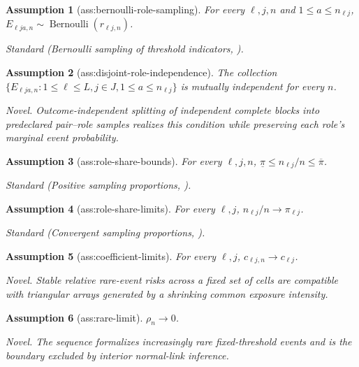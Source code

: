 \documentclass{article}
\newtheorem{assumption}{Assumption}
\begin{document}
\begin{assumption}[ass:bernoulli-role-sampling]\label{ass:bernoulli-role-sampling}
For every \(\ell,j,n\) and \(1\le a\le n_{\ell j}\), \(E_{\ell j a,n}\sim\operatorname{Bernoulli}(r_{\ell j,n})\).
\par\smallskip\noindent\emph{Standard} (Bernoulli sampling of threshold indicators, \cite{BrownCaiDasGupta2001}).
\end{assumption}

\begin{assumption}[ass:disjoint-role-independence]\label{ass:disjoint-role-independence}
The collection \(\{E_{\ell j a,n}:1\le\ell\le L, j\in J,1\le a\le n_{\ell j}\}\) is mutually independent for every \(n\).
\par\smallskip\noindent\emph{Novel.} Outcome-independent splitting of independent complete blocks into predeclared pair--role samples realizes this condition while preserving each role's marginal event probability.
\end{assumption}

\begin{assumption}[ass:role-share-bounds]\label{ass:role-share-bounds}
For every \(\ell,j,n\), \(\underline\pi\le n_{\ell j}/n\le\overline\pi\).
\par\smallskip\noindent\emph{Standard} (Positive sampling proportions, \cite{DjuazonTsyawo2026}).
\end{assumption}

\begin{assumption}[ass:role-share-limits]\label{ass:role-share-limits}
For every \(\ell,j\), \(n_{\ell j}/n\to\pi_{\ell j}\).
\par\smallskip\noindent\emph{Standard} (Convergent sampling proportions, \cite{DjuazonTsyawo2026}).
\end{assumption}

\begin{assumption}[ass:coefficient-limits]\label{ass:coefficient-limits}
For every \(\ell,j\), \(c_{\ell j,n}\to c_{\ell j}\).
\par\smallskip\noindent\emph{Novel.} Stable relative rare-event risks across a fixed set of cells are compatible with triangular arrays generated by a shrinking common exposure intensity.
\end{assumption}

\begin{assumption}[ass:rare-limit]\label{ass:rare-limit}
\(\rho_n\to0\).
\par\smallskip\noindent\emph{Novel.} The sequence formalizes increasingly rare fixed-threshold events and is the boundary excluded by interior normal-link inference.
\end{assumption}
\end{document}
